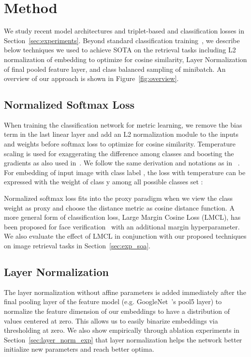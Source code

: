 \documentclass{bmvc2k}
\begin{document}
 
\section{Method} \label{sec:model}
We study recent model architectures and triplet-based and classification losses in Section~\ref{sec:experiments}. Beyond standard classification training~\cite{kaiming16}, we describe  below techniques we used to achieve SOTA on the retrieval tasks including L2 normalization of embedding to optimize for cosine similarity, Layer Normalization of final pooled feature layer, and class balanced sampling of minibatch. An overview of our approach is shown in Figure~\ref{fig:overview}.

\subsection{Normalized Softmax Loss}
When training the classification network for metric learning, we remove the bias term in the last linear layer and add an L2 normalization module to the inputs and weights before softmax loss to optimize for cosine similarity. Temperature scaling is used for exaggerating the difference among classes and boosting the gradients as also used in~\cite{scalablenca, Wang2018CosFaceLM,Liu2017SphereFaceDH}. We follow the same derivation and notations as in ~\cite{nofusslearning}. For embedding  of input image with class label , the loss with temperature  can be expressed with the weight of class y  among all possible classes set :

Normalized softmax loss fits into the proxy paradigm when we view the class weight as proxy and choose the distance metric as cosine distance function. A more general form of classification loss, Large Margin Cosine Loss (LMCL), has been proposed for face verification~\cite{Wang2018CosFaceLM} with an additional margin hyperparameter. We also evaluate the effect of LMCL in conjunction with our proposed techniques on image retrieval tasks in Section~\ref{sec:exp_soa}.
 
\subsection{Layer Normalization}
The layer normalization without affine parameters\cite{layernorm} is added immediately after the final pooling layer of the feature model (e.g. GoogleNet~\cite{googlenet2014}'s pool5 layer) to normalize the feature dimension of our embeddings to have a distribution of values centered at zero. This allows us to easily binarize embeddings via thresholding at zero. We also show empirically through ablation experiments in Section~\ref{sec:layer_norm_exp} that layer normalization helps the network better initialize new parameters and reach better optima.
 
\end{document}
